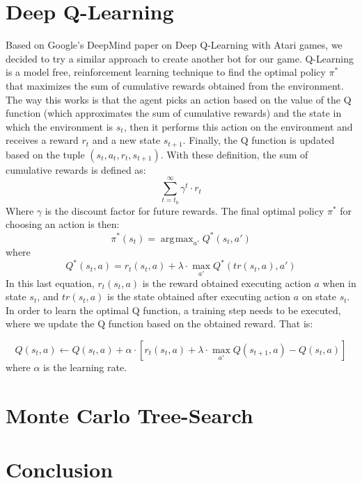 \documentclass{article}
\DeclareMathOperator*{\argmax}{arg\!max}
\begin{document}
	\section{Deep Q-Learning}
	Based on Google's DeepMind paper on Deep Q-Learning with Atari games, we decided to try a similar approach to create another bot for our game. Q-Learning  is a model free, reinforcement learning technique to find the optimal policy $\pi^*$ that maximizes the sum of cumulative rewards obtained from the environment. The way this works is that the agent picks an action based on the value of the Q function (which approximates the sum of cumulative rewards) and the state in which the environment is $s_t$, then it performs this action on the environment and receives a reward $r_t$ and a new state $s_{t+1}$. Finally, the Q function is updated based on the tuple $(s_t,a_t,r_t,s_{t+1})$. With these definition, the sum of cumulative rewards is defined as: 
	\begin{equation}
	 \sum_{t=t_0}^\infty\gamma^t\cdot r_t   
	\end{equation}
	Where $\gamma$ is the discount factor for future rewards. The final optimal policy $\pi^*$ for choosing an action is then:
	\begin{equation}
	    \pi^*(s_t) = \argmax_{a'}Q^*(s_t,a')
	\end{equation}
	where
	\begin{equation}
	    Q^*(s_t,a) = r_t(s_t,a) + \lambda \cdot \max_{a'}Q^*(tr(s_t, a), a')
	\end{equation}
	In this last equation, $r_t(s_t,a)$ is the reward obtained executing action $a$ when in state $s_t$, and $tr(s_t, a)$ is the state obtained after executing action $a$ on state $s_t$. In order to learn the optimal Q function, a training step needs to be executed, where we update the Q function based on the obtained reward. That is:
	
	\begin{equation}
	    Q(s_t, a) \leftarrow Q(s_t,a) + \alpha\cdot[r_t(s_t,a)+\lambda\cdot\max_{a'}Q(s_{t+1},a) - Q(s_t,a)]
	\end{equation}
	where $\alpha$ is the learning rate.
	
	
	\section{Monte Carlo Tree-Search}
	
	
	
	\section{Conclusion}
	
	
	
\end{document}
